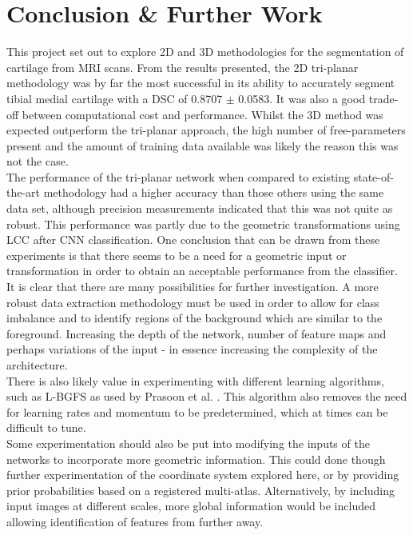 \documentclass[11pt,a4paper]{memoir}
\numberwithin{figure}{section}
\numberwithin{table}{section}
\numberwithin{equation}{section}
\begin{document}
\chapter{Conclusion \& Further Work}

This project set out to explore 2D and 3D methodologies for the segmentation of cartilage from MRI scans.  From the results presented, the 2D tri-planar methodology was by far the most successful in its ability to accurately segment tibial medial cartilage with a DSC of 0.8707 $\pm$ 0.0583. It was also a good trade-off between computational cost and performance. Whilst the 3D method was expected outperform the tri-planar approach, the high number of free-parameters present and the amount of training data available was likely the reason this was not the case. \\

The performance of the tri-planar network when compared to existing state-of-the-art methodology had a higher accuracy than those others using the same data set, although precision measurements indicated that this was not quite as robust. This performance was partly due to the geometric transformations using LCC after CNN classification. One conclusion that can be drawn from these experiments is that there seems to be a need for a geometric input or transformation in order to obtain an acceptable performance from the classifier. \\

It is clear that there are many possibilities for further investigation. A more robust data extraction methodology must be used in order to allow for class imbalance and to identify regions of the background which are similar to the foreground. Increasing the depth of the network, number of feature maps and perhaps variations of the input - in essence increasing the complexity of the architecture.\\

There is also likely value in experimenting with different learning algorithms, such as L-BGFS as used by Prasoon et al. \cite{Prasoon2013DeepNetwork}. This algorithm also removes the need for learning rates and momentum to be predetermined, which at times can be difficult to tune. \\

Some experimentation should also be put into modifying the inputs of the networks to incorporate more geometric information. This could done though further experimentation of the coordinate system explored here, or by providing prior probabilities based on a registered multi-atlas. Alternatively, by including input images at different scales, more global information would be included allowing identification of features from further away.
\clearpage



\end{document}
